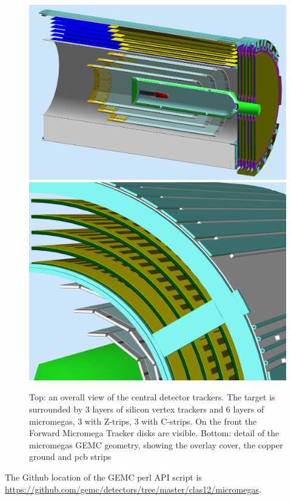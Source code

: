 \begin{figure}
	\centering
	\includegraphics[width=0.99\columnwidth,keepaspectratio]{img/bmtGeometry.png}
	\includegraphics[width=0.99\columnwidth,keepaspectratio]{img/bmtDetail.png}
	\caption{Top: an overall view of the central detector trackers. The target is surrounded by 3 layers of silicon vertex trackers and
            6 layers of micromegas, 3 with Z-trips, 3 with C-strips. On the front the Forward Micromega Tracker disks are visible.
            Bottom: detail of the micromegas GEMC geometry, showing the overlay cover, the copper ground and pcb strips}
	\label{fig:bmtGeometry}
\end{figure}

The Github location of the GEMC perl API script is \url{https://github.com/gemc/detectors/tree/master/clas12/micromegas}.


